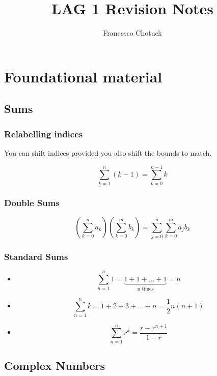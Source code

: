 \documentclass[12pt, a4paper]{article}
\title{LAG 1 Revision Notes}
\date{}
\author{Francesco Chotuck}
\theoremstyle{definition}
\theoremstyle{plain}
\begin{document}
 
\maketitle 

\tableofcontents

\pagebreak

\section{Foundational material}

\subsection{Sums}

\subsubsection{Relabelling indices}

You can shift indices provided you also shift the bounds to match.

$$\sum_{k=1}^{n} (k-1) = \sum_{k=0}^{n-1} k$$

\subsubsection{Double Sums}

$$\left(\sum_{k=0}^{n} a_k \right)\left(\sum_{k=0}^{m} b_k \right) = \sum_{j=0}^{n} \sum_{k=0}^{m} a_jb_k$$

\subsubsection{Standard Sums}

\begin{itemize}

	\item $$\sum_{n=1}^{n} 1 = \underbrace{1+1+\ldots+1}_\text{n times} =n$$

	\item $$\sum_{n=1}^{n} k = 1+2+3+\ldots+n = \frac{1}{2}n(n+1)$$

	\item $$\sum_{n=1}^{n} r^k = \frac{r-r^{n+1}}{1-r} $$

\end{itemize}

\subsection{Complex Numbers}
\end{document}
